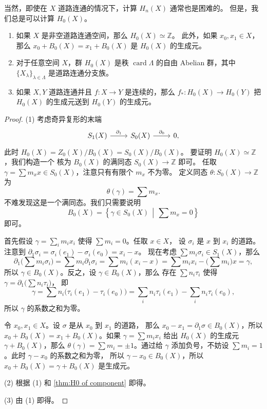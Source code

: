 \documentclass[fontset=none]{Notes}
\DeclareMathOperator\card{card}
\begin{document}
当然，即使在 $X$ 道路连通的情况下，计算 $H_n(X)$ 通常也是困难的。
但是，我们总是可以计算 $H_0(X)$。

\begin{theorem}\label{thm:H0 of space}
  \mbox{}
  \begin{enumerate}
    \item 如果 $X$ 是非空道路连通空间，那么 $H_0(X)\simeq \mathbb{Z}$。
    此外，如果 $x_0,x_1\in X$，那么 $x_0+B_0(X)=x_1+B_0(X)$ 
    是 $H_0(X)$ 的生成元。
    \item 对于任意空间 $X$，群 $H_0(X)$ 是秩 $\card\Lambda$ 的自由
    Abelian 群，其中 $\{X_\lambda\}_{\lambda\in \Lambda}$
    是道路连通分支族。
    \item 如果 $X,Y$ 道路连通并且 $f:X\to Y$ 是连续的，那么
    $f_*:H_0(X)\to H_0(Y)$ 把 $H_0(X)$ 的生成元送到 $H_0(Y)$ 的生成元。
  \end{enumerate}
\end{theorem}
\begin{proof}
  (1) 考虑奇异复形的末端
  \[
    \begin{tikzcd}
      S_1(X)\arrow[r,"\partial_1"] & S_0(X)\arrow[r,"\partial_0"] & 0,
    \end{tikzcd}
  \]
  此时 $H_0(X)=Z_0(X)/B_0(X)=S_0(X)/B_0(X)$。
  要证明 $H_0(X)\simeq \mathbb{Z}$，我们构造一个
  核为 $B_0(X)$ 的满同态 $S_0(X)\to \mathbb{Z}$ 即可。
  任取 $\gamma=\sum m_xx\in S_0(X)$，注意只有有限个 $m_x$ 不为零。
  定义同态 $\theta:S_0(X)\to \mathbb{Z}$ 为
  \[
    \theta(\gamma)=\sum m_x.
  \]
  不难发现这是一个满同态。我们只需要说明
  \[
    B_0(X)=\left\{\gamma\in S_0(X)\,\middle|\, \sum m_x=0\right\}
  \]
  即可。

  首先假设 $\gamma=\sum_i m_i x_i$ 使得 $\sum m_i=0$。任取 $x\in X$，
  设 $\sigma_i$ 是 $x$ 到 $x_i$ 的道路。注意到 $\partial_1\sigma_i=\sigma_i(e_1)-\sigma_i(e_0)=x_i-x$。
  现在考虑 $\sum m_i\sigma_i\in S_1(X)$，那么 
  \[
    \partial_1\bigl(\sum m_i\sigma_i\bigr)
    =\sum m_i\partial_1\sigma_i=\sum m_i(x_i-x)=
    \sum m_ix_i-\bigl(\sum m_i\bigr)x=\gamma,
  \]
  所以 $\gamma\in B_0(X)$。反之，设 $\gamma\in B_0(X)$，那么
  存在 $\sum n_i\tau_i$ 使得 $\gamma=\partial_1\bigl(\sum n_i\tau_i\bigr)$，
  即
  \[
    \gamma=\sum n_i\bigl(\tau_i(e_1)-\tau_i(e_0)\bigr)=
    \sum_i n_i\tau_i(e_1)-\sum_i n_i\tau_i(e_0),
  \]
  所以 $\gamma$ 的系数之和为零。

  令 $x_0,x_1\in X$。设 $\sigma$ 是从 $x_0$ 到 $x_1$ 的道路，
  那么 $x_0-x_1=\partial_1\sigma\in B_0(X)$，所以
  $x_0+B_0(X)=x_1+B_0(X)$。如果 $\gamma=\sum m_ix_i$ 给出 $H_0(X)$
  的生成元 $\gamma+B_0(X)$，那么 $\theta(\gamma)=\sum m_i=\pm 1$。通过给 $\gamma$
  添加负号，不妨设 $\sum m_i=1$。此时 $\gamma-x_0$ 的系数之和为零，
  所以 $\gamma-x_0\in B_0(X)$，所以 $x_0+B_0(X)=\gamma+B_0(X)$ 是生成元。

  (2) 根据 (1) 和 \autoref{thm:H0 of component} 即得。

  (3) 由 (1) 即得。
\end{proof}
\end{document}
